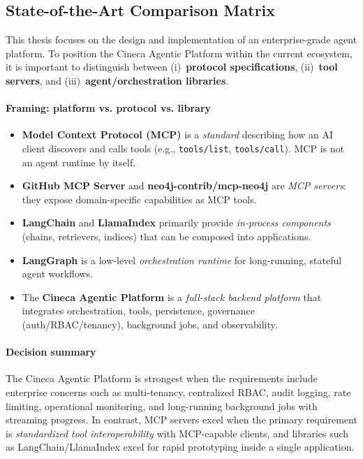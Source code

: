 \documentclass[a4paper,twoside]{sapthesis}
\begin{document}

\subsection{State-of-the-Art Comparison Matrix}

This thesis focuses on the design and implementation of an enterprise-grade agent platform.
To position the Cineca Agentic Platform within the current ecosystem, it is important to
distinguish between (i) \,\textbf{protocol specifications}, (ii) \,\textbf{tool servers},
and (iii) \,\textbf{agent/orchestration libraries}.

\paragraph{Framing: platform vs. protocol vs. library}
\begin{itemize}
    \item \textbf{Model Context Protocol (MCP)} is a \emph{standard} describing how an AI client discovers and calls tools (e.g., \texttt{tools/list}, \texttt{tools/call}). MCP is not an agent runtime by itself.
    \item \textbf{GitHub MCP Server} and \textbf{neo4j-contrib/mcp-neo4j} are \emph{MCP servers}: they expose domain-specific capabilities as MCP tools.
    \item \textbf{LangChain} and \textbf{LlamaIndex} primarily provide \emph{in-process components} (chains, retrievers, indices) that can be composed into applications.
    \item \textbf{LangGraph} is a low-level \emph{orchestration runtime} for long-running, stateful agent workflows.
    \item The \textbf{Cineca Agentic Platform} is a \emph{full-stack backend platform} that integrates orchestration, tools, persistence, governance (auth/RBAC/tenancy), background jobs, and observability.
\end{itemize}

\paragraph{Decision summary}
The Cineca Agentic Platform is strongest when the requirements include enterprise concerns
such as multi-tenancy, centralized RBAC, audit logging, rate limiting, operational monitoring,
and long-running background jobs with streaming progress. In contrast, MCP servers excel when
the primary requirement is \emph{standardized tool interoperability} with MCP-capable clients,
and libraries such as LangChain/LlamaIndex excel for rapid prototyping inside a single application.
\end{document}
